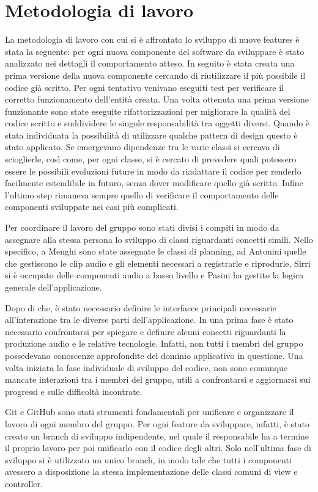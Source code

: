 \documentclass[a4paper,12pt]{report}
\begin{document}
\section{Metodologia di lavoro}
La metodologia di lavoro con cui si è affrontato lo sviluppo di nuove features è stata la seguente: per ogni nuova componente del software da sviluppare è stato analizzato nei dettagli il comportamento atteso.
In seguito è stata creata una prima versione della nuova componente cercando di riutilizzare il più possibile il codice già scritto.
Per ogni tentativo venivano eseguiti test per verificare il corretto funzionamento dell’entità creata. 
Una volta ottenuta una prima versione funzionante sono state eseguite rifattorizzazioni per migliorare la qualità del codice scritto e suddividere le singole responsabilità tra oggetti diversi. Quando è stata individuata la possibilità di utilizzare qualche pattern di design questo è stato applicato.
Se emergevano dipendenze tra le varie classi si cercava di scioglierle, così come, per ogni classe, si è cercato di prevedere quali potessero essere le possibili evoluzioni future in modo da riadattare il codice per renderlo facilmente estendibile in futuro, senza dover modificare quello già scritto.
Infine l’ultimo step rimaneva sempre quello di verificare il comportamento delle componenti sviluppate nei casi più complicati.

Per coordinare il lavoro del gruppo sono stati divisi i compiti in modo da assegnare alla stessa persona lo sviluppo di classi riguardanti concetti simili. Nello specifico, a Menghi sono state assegnate le classi di planning, ad Antonini quelle che gestiscono le clip audio e gli elementi necessari a registrarle e riprodurle, Sirri si è occupato delle componenti audio a basso livello e Pasini ha gestito la logica generale dell'applicazione.

Dopo di che, è stato necessario definire le interfacce principali necessarie all’interazione tra le diverse parti dell’applicazione.
In una prima fase è stato necessario confrontarsi per spiegare e definire alcuni concetti riguardanti la produzione audio e le relative tecnologie. Infatti, non tutti i membri del gruppo possedevano conoscenze approfondite del dominio applicativo in questione. 
Una volta iniziata la fase individuale di sviluppo del codice, non sono comunque mancate interazioni tra i membri del gruppo, utili a confrontarsi e aggiornarsi sui progressi e sulle difficoltà incontrate.

Git e GitHub sono stati strumenti fondamentali per unificare e organizzare il lavoro di ogni membro del gruppo. Per ogni feature da sviluppare, infatti, è stato creato un branch di sviluppo indipendente, nel quale il responsabile ha a termine il proprio lavoro per poi unificarlo con il codice degli altri. Solo nell'ultima fase di sviluppo si è utilizzato un unico branch, in modo tale che tutti i componenti avessero a disposizione la stessa implementazione delle classi comuni di view e controller.
\end{document}
